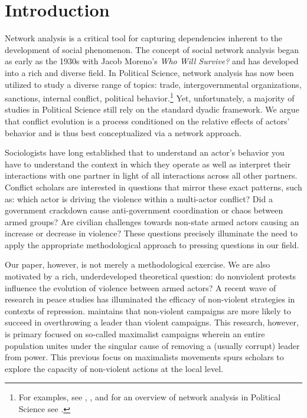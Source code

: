 \section*{Introduction}

Network analysis is a critical tool for capturing dependencies inherent to the development of social phenomenon. The concept of social network analysis began as early as the 1930s with Jacob Moreno's \textit{Who Will Survive?} and has developed into a rich and diverse field. In Political Science, network analysis has now been utilized to study a diverse range of topics: trade, intergovernmental organizations, sanctions, internal conflict, political behavior.\footnote{For examples, see \cite{dorussen2010}, \cite{cao2009}, \cite{cranmer2014} and for an overview of network analysis in Political Science see \cite{ward2011}.} Yet, unfortunately, a majority of studies in Political Science still rely on the standard dyadic framework. We argue that conflict evolution is a process conditioned on the relative effects of actors' behavior and is thus best conceptualized via a network approach. 	

Sociologists have long established that to understand an actor's behavior you have to understand the context in which they operate as well as interpret their interactions with one partner in light of all interactions across all other partners. Conflict scholars are interested in questions that mirror these exact patterns, such as: which actor is driving the violence within a multi-actor conflict? Did a government crackdown cause anti-government coordination or chaos between armed groups? Are civilian challenges towards non-state armed actors causing an increase or decrease in violence? These questions precisely illuminate the need to apply the appropriate methodological approach to pressing questions in our field.

Our paper, however, is not merely a methodological exercise. We are also motivated by a rich, underdeveloped theoretical question: do nonviolent protests influence the evolution of violence between armed actors?  A recent wave of research in peace studies has illuminated the efficacy of non-violent strategies in contexts of repression. \cite{chenoweth2011} maintains that non-violent campaigns are more likely to succeed in overthrowing a leader than violent campaigns. This research, however, is primary focused on so-called maximalist campaigns wherein an entire population unites under the singular cause of removing a (usually corrupt) leader from power. This previous focus on maximalists movements spurs scholars to explore the capacity of non-violent actions at the local level. 

